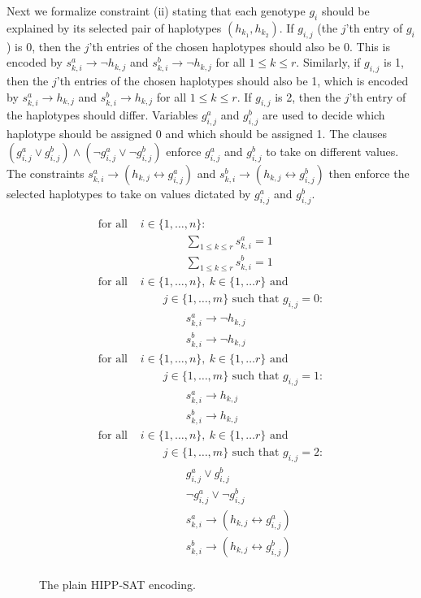 \documentclass[12pt,a4paper]{article}
\begin{document}
Next we formalize constraint (ii) stating that each genotype $g_i$ should be explained by its selected pair of haplotypes $(h_{k_1}, h_{k_2})$.
If $g_{i,j}$ (the $j$'th entry of $g_i$) is 0, then the $j$'th entries of the chosen haplotypes should also be 0.
This is encoded by $s^a_{k,i}\rightarrow\neg h_{k,j}$ and $s^b_{k,i}\rightarrow\neg h_{k,j}$ for all $1\leq k \leq r$.
Similarly, if $g_{i,j}$ is 1, then the $j$'th entries of the chosen haplotypes should also be 1, which is encoded by $s^a_{k,i}\rightarrow h_{k,j}$ and $s^b_{k,i}\rightarrow h_{k,j}$ for all $1\leq k \leq r$.
If $g_{i,j}$ is 2, then the $j$'th entry of the haplotypes should differ.
Variables $g^a_{i,j}$ and $g^b_{i,j}$ are used to decide which haplotype should be assigned 0 and which should be assigned 1.
The clauses $(g^a_{i,j}\vee g^b_{i,j})\wedge(\neg g^a_{i,j}\vee \neg g^b_{i,j})$ enforce $g^a_{i,j}$ and $g^b_{i,j}$ to take on different values.
The constraints $s^a_{k,i}\rightarrow (h_{k,j}\leftrightarrow g^a_{i,j})$ and $s^b_{k,i}\rightarrow (h_{k,j}\leftrightarrow g^b_{i,j})$ then enforce the selected haplotypes to take on values dictated by $g^a_{i,j}$ and $g^b_{i,j}$.
\begin{figure}
\centering
\small
\begin{mdframed}
\begin{align}
\text{for all  }& i\in\{1,\dots , n\}:\nonumber\\
& \quad\quad\quad\quad \sum_{1\leq k \leq r} s^a_{k,i} = 1 \\
& \quad\quad\quad\quad \sum_{1\leq k \leq r} s^b_{k,i} = 1 \\
\text{for all  }& i\in\{1,\dots , n\},\ k\in\{1,\dots r\}\text{ and }\nonumber\\&\quad\quad j\in\{1,\dots ,m\} \text{ such that }g_{i,j}=0:\nonumber\\
& \quad\quad\quad\quad s^a_{k,i}\rightarrow \neg h_{k,j} \\
& \quad\quad\quad\quad s^b_{k,i}\rightarrow \neg h_{k,j} \\
\text{for all  }& i\in\{1,\dots , n\},\ k\in\{1,\dots r\}\text{ and }\nonumber\\&\quad\quad j\in\{1,\dots ,m\} \text{ such that }g_{i,j}=1:\nonumber\\
& \quad\quad\quad\quad s^a_{k,i}\rightarrow h_{k,j} \\
& \quad\quad\quad\quad s^b_{k,i}\rightarrow h_{k,j} \\
\text{for all  }& i\in\{1,\dots , n\},\ k\in\{1,\dots r\}\text{ and }\nonumber\\&\quad\quad j\in\{1,\dots ,m\} \text{ such that }g_{i,j}=2:\nonumber\\
& \quad\quad\quad\quad g^a_{i,j}\vee g^b_{i,j} \\
& \quad\quad\quad\quad \neg g^a_{i,j}\vee \neg g^b_{i,j} \\
& \quad\quad\quad\quad s^a_{k,i}\rightarrow (h_{k,j}\leftrightarrow g^a_{i,j}) \\
& \quad\quad\quad\quad s^b_{k,i}\rightarrow (h_{k,j}\leftrightarrow g^b_{i,j}) \\
\end{align}
\end{mdframed}
\caption{The plain HIPP-SAT encoding.}
\label{fig:enc-hipp-sat}
\end{figure}
\end{document}
